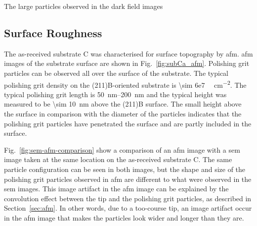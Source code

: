 The large particles observed in the dark field images 

\subsection{Surface Roughness}
The as-received substrate C was characterised for surface topography by \ac{afm}. \Ac{afm} images of the substrate surface are shown in Fig.~\ref{fig:subCa_afm}. Polishing grit particles can be observed all over the surface of the substrate. The typical polishing grit density on the (211)B-oriented substrate is \SI{\sim 6e7 }{\particle\centi\metre^{-2}}. The typical polishing grit length is \SIrange{50}{200}{\nano\metre} and the typical height was measured to be \SI{\sim 10}{\nano\metre} above the (211)B surface. The small height above the surface in comparison with the diameter of the particles indicates that the polishing grit particles have penetrated the surface and are partly included in the surface.

Fig.~\ref{fig:sem-afm-comparison} show a comparison of an \ac{afm} image with a \ac{sem} image taken at the same location on the as-received substrate C. The same particle configuration can be seen in both images, but the shape and size of the polishing grit particles observed in \ac{afm} are different to what were observed in the \ac{sem} images. This image artifact in the \ac{afm} image can be explained by the convolution effect between the tip and the polishing grit particles, as described in Section~\ref{sec:afm}. In other words, due to a too-course tip, an image artifact occur in the \ac{afm} image that makes the particles look wider and longer than they are. 

